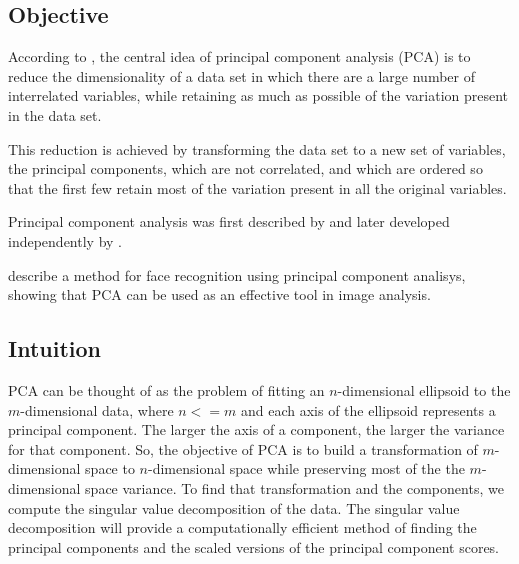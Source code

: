 \documentclass{article} %
\begin{document}
\subsection{Objective}
According to \citet{jolliffe1986principal}, the central idea of principal component analysis (PCA) is to reduce the dimensionality of a data set in which there are a large number of interrelated variables, while retaining as much as possible of the variation present in the data set.\par
This reduction is achieved by transforming the data set to a new set of variables, the principal components, which are not correlated, and which are ordered so that the first few retain most of the variation present in all the original variables.\par Principal component analysis was first described by \citet{pearson1901principal} and later developed independently by \citet{hotelling1933analysis} \citep{jolliffe1986principal}.\par
\citet{craw1992face} describe a method for face recognition using principal component analisys, showing that PCA can be used as an effective tool in image analysis.
\subsection{Intuition}
PCA can be thought of as the problem of fitting an $n$-dimensional ellipsoid to the $m$-dimensional data, where $n<=m$ and each axis of the ellipsoid represents a principal component. The larger the axis of a component, the larger the variance for that component. So, the objective of PCA is to build a transformation of $m$-dimensional space to $n$-dimensional space while preserving most of the the $m$-dimensional space variance. To find that transformation and the components, we compute the singular value decomposition of the data. The singular value decomposition will provide a computationally efficient method of finding the principal components and the scaled versions of the principal component scores.
\end{document}
